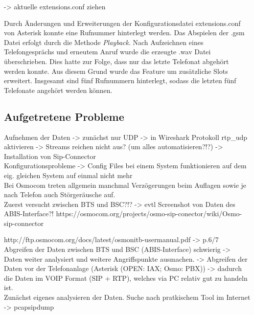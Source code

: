 -> aktuelle extensions.conf ziehen



Durch Änderungen und Erweiterungen der Konfigurationsdatei extensions.conf von Asterisk konnte eine Rufnummer hinterlegt werden. Das Abspielen der .gsm Datei erfolgt durch die Methode \textit{Playback}. Nach Aufzeichnen eines Telefongesprächs und erneutem Anruf wurde die erzeugte .wav Datei überschrieben. Dies hatte zur Folge, dass nur das letzte Telefonat abgehört werden konnte. Aus diesem Grund wurde das Feature um zusätzliche Slots erweitert. Insgesamt sind fünf Rufnummern hinterlegt, sodass die letzten fünf Telefonate angehört werden können. 


\subsection{Aufgetretene Probleme}

Aufnehmen der Daten -> zunächst nur UDP -> in Wireshark Protokoll rtp\_udp aktivieren -> Streams reichen nicht aus? (um alles automatisieren?!?) -> Installation von Sip-Connector\\

Konfigurationsprobleme -> Config Files bei einem System funktionieren auf dem eig. gleichen System auf einmal nicht mehr\\

Bei Osmocom treten allgemein manchmal Verzögerungen beim Auflagen sowie je nach Telefon auch Störgeräusche auf.\\



Zuerst versucht zwischen BTS und BSC?!?
-> evtl Screenshot von Daten des ABIS-Interface?!
https://osmocom.org/projects/osmo-sip-conector/wiki/Osmo-sip-connector

http://ftp.osmocom.org/docs/latest/osmonitb-usermanual.pdf -> p.6/7 \\

Abgreifen der Daten zwischen BTS und BSC (ABIS-Interface) schwierig -> Daten weiter analysiert und weitere Angriffspunkte ausmachen.
-> Abgreifen der Daten vor der Telefonanlage (Asterisk (OPEN: IAX; Osmo: PBX)) -> dadurch die Daten im VOIP Format (SIP + RTP), welches via PC relativ gut zu handeln ist. \\

Zunächst eigenes analysieren der Daten. Suche nach pratkischem Tool im Internet
-> pcapsipdump\\





